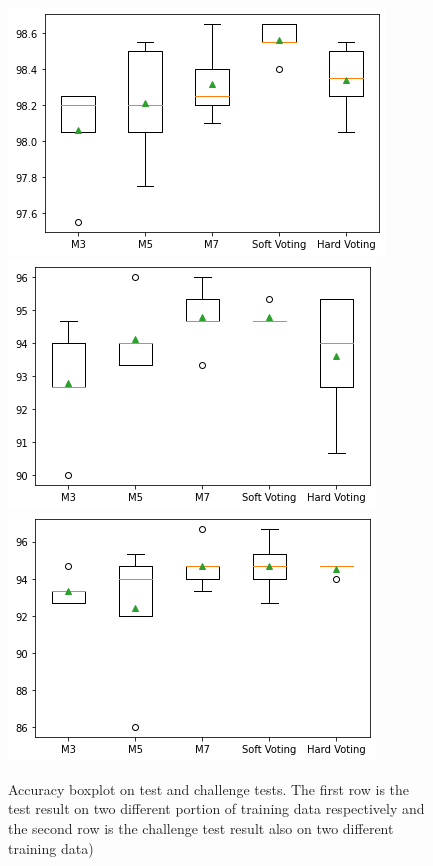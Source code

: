\documentclass{article}
\begin{document}
\begin{figure}[!htb]
\endminipage\hfill
{}
  \includegraphics[width=\linewidth]{figure/cnn_test_2.png}
\endminipage\hfill
{}
  \includegraphics[width=\linewidth]{figure/cnn_challenge_1.png}
\endminipage\hfill
{}
  \includegraphics[width=\linewidth]{figure/cnn_challenge_2.png}
\endminipage\hfill
\caption{Accuracy boxplot on test and challenge tests. The first row is the test result on two different portion of training data respectively and the second row is the challenge test result also on two different training data)}
\label{cnn_box}
\end{figure}
\end{document}
